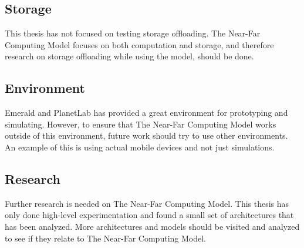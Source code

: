 \subsection{Storage}
This thesis has not focused on testing storage offloading. The Near-Far Computing Model focuses on both computation and storage, and therefore research on storage offloading while using the model, should be done.

\subsection{Environment}
Emerald and PlanetLab has provided a great environment for prototyping and simulating. However, to ensure that The Near-Far Computing Model works outside of this environment, future work should try to use other environments. An example of this is using actual mobile devices and not just simulations.

\subsection{Research}
Further research is needed on The Near-Far Computing Model. This thesis has only done high-level experimentation and found a small set of architectures that has been analyzed. More architectures and models should be visited and analyzed to see if they relate to The Near-Far Computing Model.

